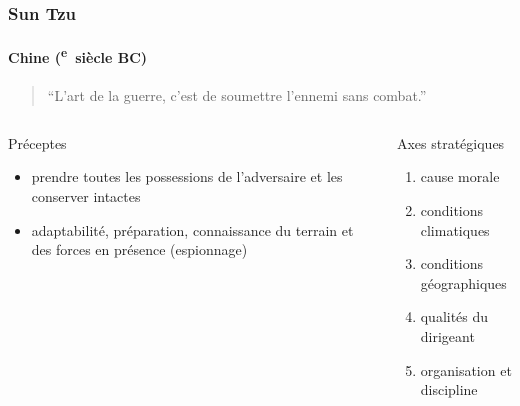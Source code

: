\documentclass[utf8]{beamer}
\newcommand{\cRM}[1]{\MakeUppercase{\romannumeral #1}}  %
\newcommand{\siecle}[1]{\cRM{#1}\textsuperscript{e}~siècle}
\begin{document}
\begin{frame}
\frametitle{Sun Tzu}
\framesubtitle{Chine (\siecle{6} BC)}
\begin{quote}“L'art de la guerre, c'est de soumettre l'ennemi sans combat.”\end{quote}
\vfill
\begin{columns}[t]
\begin{column}{0.5\linewidth}
Préceptes
\begin{itemize}
\item prendre toutes les possessions de l'adversaire et les conserver intactes
\item adaptabilité, préparation, connaissance du terrain et des forces en présence (espionnage)
\end{itemize}
\end{column}
\begin{column}{0.5\linewidth}
Axes stratégiques
\begin{enumerate}
\item cause morale
\item conditions climatiques
\item conditions géographiques
\item qualités du dirigeant
\item organisation et discipline
\end{enumerate}
\end{column}
\end{columns}

\end{frame}
\end{document}
